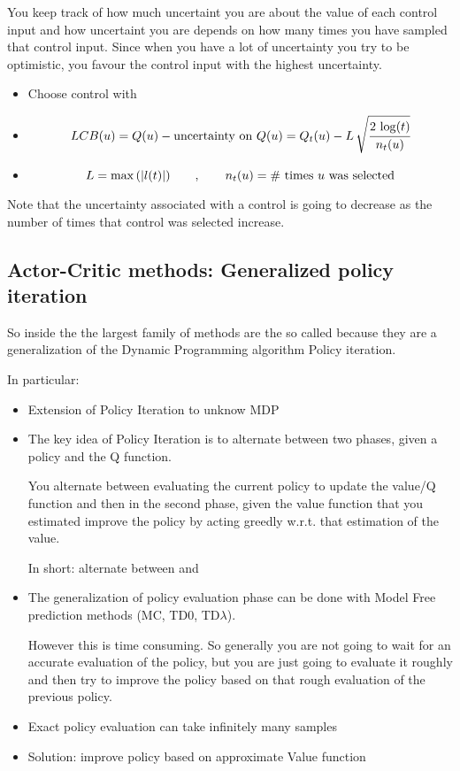 \begin{itemize}
You keep track of how much uncertaint you are about the value of each control input and how uncertaint you are depends on how many times you have sampled that control input. Since when you have a lot of uncertainty you try to be optimistic, you favour the control input with the highest uncertainty.
\begin{itemize}
\item Choose control with 
\item \[LCB(u) = Q(u) - \text{uncertainty on }Q(u) = Q_t(u) - L\,\sqrt{\cfrac{2\,\log(t)}{n_t(u)}}\]
\item \[L = \max{(\lvert l(t)\rvert)}\qquad,\qquad n_t(u) = \text{\# times }u\text{ was selected}\]
\end{itemize}
Note that the uncertainty associated with a control is going to decrease as the number of times that control was selected increase.
\end{itemize}

\subsection{Actor-Critic methods: Generalized policy iteration}
So inside the  the largest family of methods are the so called  because they are a generalization of the Dynamic Programming algorithm Policy iteration.

In particular:
\begin{itemize}
\item Extension of Policy Iteration to unknow MDP
\item The key idea of Policy Iteration is to alternate between two phases, given a policy and the Q function.

You alternate between evaluating the current policy to update the value/Q function and then in the second phase, given the value function that you estimated improve the policy by acting greedly w.r.t. that estimation of the value.

In short: alternate between  and 
\item The generalization of policy evaluation phase can be done with Model Free prediction methods (MC, TD0, TD$\lambda$).

However this is time consuming. So generally you are not going to wait for an accurate evaluation of the policy, but you are just going to evaluate it roughly and then try to improve the policy based on that rough evaluation of the previous policy.
\item Exact policy evaluation can take infinitely many samples
\item Solution: improve policy based on approximate Value function
\end{itemize}

